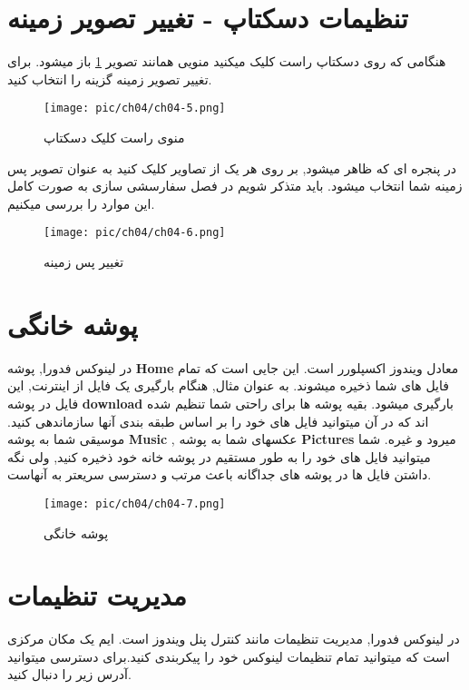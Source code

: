 \section{تنظیمات دسکتاپ - تغییر تصویر زمینه}\label{se-35}
هنگامی که روی دسکتاپ راست کلیک میکنید منویی همانند تصویر
\ref{pic-21}
باز میشود. برای تغییر تصویر زمینه گزینه
را انتخاب کنید.
\begin{figure}[H]%
	\caption{منوی راست کلیک دسکتاپ}
	\begin{center}
		\texttt{[image: pic/ch04/ch04-5.png]}
	\end{center}
	\label{pic-21}
\end{figure}
در پنجره ای که ظاهر میشود, بر روی هر یک از تصاویر کلیک کنید به عنوان تصویر پس زمینه شما انتخاب میشود. باید متذکر شویم در فصل سفارسشی سازی به صورت کامل این موارد را بررسی میکنیم.
\begin{figure}[H]%
	\caption{تغییر پس زمینه}
	\begin{center}
		\texttt{[image: pic/ch04/ch04-6.png]}
	\end{center}
	\label{pic-22}
\end{figure}
\section{پوشه خانگی}\label{se-36}
در لینوکس فدورا, پوشه
\textbf{Home}
معادل ویندوز اکسپلورر
است. این جایی است که تمام فایل های شما ذخیره میشوند. به عنوان مثال, هنگام بارگیری
یک فایل از اینترنت, این فایل در پوشه
\textbf{download}
بارگیری میشود. بقیه پوشه ها برای راحتی شما تنظیم شده اند که در آن میتوانید فایل های خود را بر اساس طبقه بندی آنها سازماندهی کنید. موسیقی شما به پوشه 
\textbf{Music}
, عکسهای شما به پوشه
\textbf{Pictures}
میرود و غیره. شما میتوانید فایل های خود را به طور مستقیم در پوشه خانه خود ذخیره کنید, ولی نگه داشتن فایل ها در پوشه های جداگانه باعث مرتب و دسترسی سریعتر به آنهاست. 
\begin{figure}[H]%
	\caption{پوشه خانگی}
	\begin{center}
		\texttt{[image: pic/ch04/ch04-7.png]}
	\end{center}
	\label{pic-23}
\end{figure}
\section{مدیریت تنظیمات}\label{se-37}
در لینوکس فدورا, مدیریت تنظیمات مانند کنترل پنل ویندوز است.
ایم یک مکان مرکزی است که میتوانید تمام تنظیمات لینوکس خود را پیکربندی کنید.برای دسترسی میتوانید آدرس زیر را دنبال کنید.

